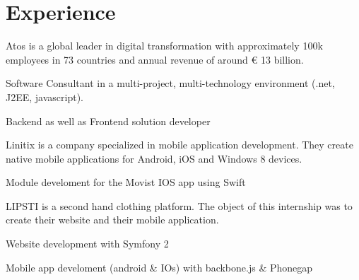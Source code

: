 \documentclass[]{my-resume}
\begin{document}
\hfill
\begin{minipage}[t]{0.66\textwidth} 


\section{Experience}

Atos is a global leader in digital transformation with approximately 100k employees in 73 countries and annual revenue of around € 13 billion.
\vspace{\topsep} %
\begin{tightemize}
\item Software Consultant in a multi-project, multi-technology environment (.net, J2EE, javascript). 
\item Backend as well as Frontend solution developer
\end{tightemize}
\sectionsep

Linitix is a company specialized in mobile application development. They create native mobile applications for Android, iOS and Windows 8 devices. 
\begin{tightemize}
\item Module develoment for the Movist IOS app using Swift
\end{tightemize}
\sectionsep

LIPSTI is a second hand clothing platform. The object of this internship was to create their website and their mobile application. 
\begin{tightemize}
\item Website development with Symfony 2
\item Mobile app develoment (android \& IOs) with backbone.js \& Phonegap
\end{tightemize}
\sectionsep



\end{minipage}
\end{document}
